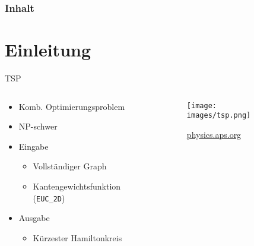


    \begin{frame}
        \frametitle{Inhalt}
        \tableofcontents
    \end{frame}


\section{Einleitung}
\begin{frame}{TSP}
\begin{columns}
    \begin{column}{0.5\textwidth}
            \begin{itemize}
        \item Komb. Optimierungsproblem
        \item NP-schwer
        \item Eingabe
        \begin{itemize}
            \item Vollständiger Graph
            \item Kantengewichtsfunktion (\texttt{EUC\_2D})
        \end{itemize}
        \item Ausgabe
        \begin{itemize}
            \item Kürzester Hamiltonkreis
        \end{itemize}
    \end{itemize}
    \end{column}
    \begin{column}{0.5\textwidth}
        \begin{figure}
            \centering
            \texttt{[image: images/tsp.png]}
            \caption{\href{https://physics.aps.org/articles/v10/s32
}{physics.aps.org}}
            \label{fig:enter-label}
        \end{figure}
    \end{column}
\end{columns}
\end{frame}


